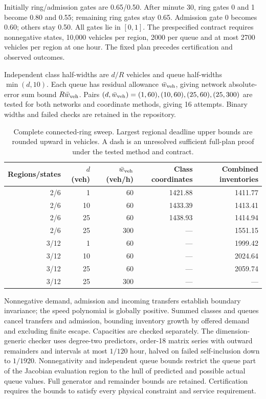 Initially ring/admission gates are 0.65/0.50. After minute 30, ring gates
0 and 1 become 0.80 and 0.55; remaining ring gates stay 0.65. Admission
gate 0 becomes 0.60; others stay 0.50. All gates lie in $[0,1]$. The
prespecified contract requires nonnegative states, 10,000 vehicles per
region, 2000 per queue and at most 2700 vehicles per region at one hour.
The fixed plan precedes certification and observed outcomes.

Independent class half-widths are $d/R$ vehicles and queue half-widths
$\min(d,10)$. Each queue has residual allowance $\bar w_{\rm veh}$, giving
network absolute-error sum bound $R\bar w_{\rm veh}$. Pairs
$(d,\bar w_{\rm veh})=(1,60),(10,60),(25,60),(25,300)$ are tested for both
networks and coordinate methods, giving 16 attempts. Binary widths and
failed checks are retained in the repository.

\begin{table}[t]
\centering\small
\caption{Complete connected-ring sweep. Largest regional deadline upper
bounds are rounded upward in vehicles. A dash is an unresolved sufficient
full-plan proof under the tested method and contract.}
\label{tab:network-transfer-complete}
\setlength{\tabcolsep}{4pt}
\begin{tabular}{@{}rrrrr@{}}
\toprule
Regions/states & $d$ (veh) & $\bar w_{\rm veh}$ (veh/h) & Class coordinates & Combined inventories\\
\midrule
2/6 & 1 & 60 & 1421.88 & 1411.77\\
2/6 & 10 & 60 & 1433.39 & 1413.41\\
2/6 & 25 & 60 & 1438.93 & 1414.94\\
2/6 & 25 & 300 & --- & 1551.15\\
3/12 & 1 & 60 & --- & 1999.42\\
3/12 & 10 & 60 & --- & 2024.64\\
3/12 & 25 & 60 & --- & 2059.74\\
3/12 & 25 & 300 & --- & ---\\
\bottomrule
\end{tabular}
\end{table}

Nonnegative demand, admission and incoming transfers establish boundary
invariance; the speed polynomial is globally positive. Summed classes and
queues cancel transfers and admission, bounding inventory growth by offered
demand and excluding finite escape. Capacities are checked separately.
The dimension-generic checker uses degree-two predictors, order-18 matrix
series with outward remainders and intervals at most $1/120$ hour, halved
on failed self-inclusion down to $1/1920$. Nonnegativity and independent queue bounds restrict the queue part of the
Jacobian evaluation region to the hull of predicted and possible actual
queue values. Full generator and remainder bounds are retained.
Certification requires the bounds to satisfy every physical constraint
and service requirement.

